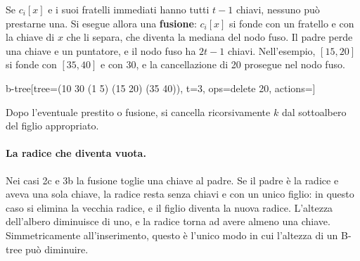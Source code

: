 \begin{description}
  \begin{casofig}[3b]
  Se $c_i[x]$ e i suoi fratelli immediati hanno tutti $t-1$ chiavi, nessuno può prestarne una. Si esegue allora una \textbf{fusione}: $c_i[x]$ si fonde con un fratello e con la chiave di $x$ che li separa, che diventa la mediana del nodo fuso. Il padre perde una chiave e un puntatore, e il nodo fuso ha $2t-1$ chiavi. Nell'esempio, $[15, 20]$ si fonde con $[35, 40]$ e con 30, e la cancellazione di 20 prosegue nel nodo fuso.
  \tcblower
  \begin{widget}{b-tree}[tree={(10 30 (1 5) (15 20) (35 40))}, t=3, ops={delete 20}, actions={}]
  \end{widget}
  \end{casofig}

  Dopo l'eventuale prestito o fusione, si cancella ricorsivamente $k$ dal sottoalbero del figlio appropriato.
\end{description}

\paragraph{La radice che diventa vuota.}
Nei casi 2c e 3b la fusione toglie una chiave al padre. Se il padre è la radice e aveva una sola chiave, la radice resta senza chiavi e con un unico figlio: in questo caso si elimina la vecchia radice, e il figlio diventa la nuova radice. L'altezza dell'albero diminuisce di uno, e la radice torna ad avere almeno una chiave. Simmetricamente all'inserimento, questo è l'unico modo in cui l'altezza di un B-tree può diminuire.


